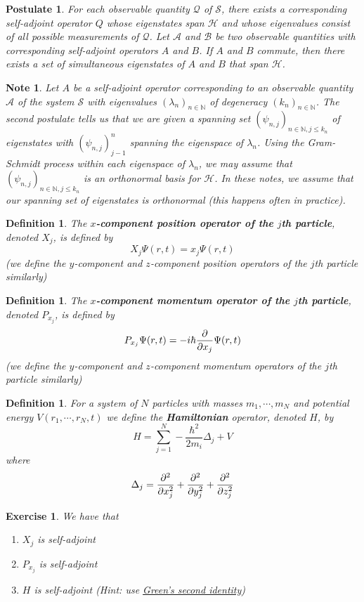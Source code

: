 \documentclass[12pt]{amsart}
\newtheorem{pos}{Postulate}
\newtheorem{defn}[thm]{Definition}
\newtheorem{note}[thm]{Note}
\newtheorem{ex}[thm]{Exercise}
\newcommand{\Del}{\Delta}
\newcommand{\lam}{\lambda}
\newcommand{\N}{\mathbb{N}}
\newcommand{\MA}{\mathcal{A}}
\newcommand{\MB}{\mathcal{B}}
\newcommand{\MS}{\mathcal{S}}
\newcommand{\MQ}{\mathcal{Q}}
\newcommand{\MH}{\mathcal{H}}
\begin{document}
\begin{pos}
	For each observable quantity $\MQ$ of $\MS$, there exists a corresponding self-adjoint operator $Q$ whose eigenstates span $\MH$ and whose eigenvalues consist of all possible  measurements of $\MQ$. Let $\MA$ and $\MB$ be two observable quantities with corresponding self-adjoint operators $A$ and $B$. If $A$ and $B$ commute, then there exists a set of simultaneous eigenstates of $A$ and $B$ that span $\MH$.
\end{pos}

\begin{note}
	Let $A$ be a self-adjoint operator corresponding to an observable quantity $\MA$ of the system $\MS$ with eigenvalues $(\lam_{n})_{n \in \N}$ of degeneracy $(k_n)_{n \in \N}$. The second postulate tells us that we are given a spanning set $(\psi_{n,j})_{n \in \N,j \leq k_n}$ of eigenstates with $(\psi_{n,j})_{j-1}^n$ spanning the eigenspace of $\lam_n$. Using the Gram-Schmidt process within each eigenspace of $\lam_n$, we may assume that $(\psi_{n,j})_{n \in \N,j \leq k_n}$ is an orthonormal basis for $\MH$. In these notes, we assume that our spanning set of eigenstates is orthonormal (this happens often in practice). 
\end{note}

\begin{defn}
	The \textbf{$x$-component position operator of the $j$th particle}, denoted $X_j$, is defined by $$X_j\Psi(r, t) = x_j\Psi(r, t)$$
	(we define the $y$-component and $z$-component position operators of the $j$th particle similarly)
\end{defn}
	
\begin{defn}
	The \textbf{$x$-component momentum operator of the $j$th particle}, denoted $P_{x_j}$, is defined by $$P_{x_j} \Psi(r, t) = -i\hbar \pdv{x_j} \Psi(r, t)$$
	(we define the $y$-component and $z$-component momentum operators of the $j$th particle similarly)
\end{defn}

\begin{defn}
	For a system of $N$ particles with masses $m_1, \cdots, m_N$ and potential energy $V(r_1, \cdots, r_N, t)$ we define the \textbf{Hamiltonian} operator, denoted $H$, by $$H =   \sum_{j=1}^N  -\frac{\hbar^2}{2m_i}\Del_j  + V$$ where $$\Del_j  = \pdv[2]{}{x_j} + \pdv[2]{}{y_j} + \pdv[2]{}{z_j}$$
\end{defn}

\begin{ex} 
	We have that
	\begin{enumerate}
		\item $X_j$ is self-adjoint
		\item $P_{x_j}$ is self-adjoint
		\item $H$ is self-adjoint (Hint: use \href{https://en.wikipedia.org/wiki/Green%27s_identities}{Green's second identity})
	\end{enumerate}
\end{ex}
\end{document}
